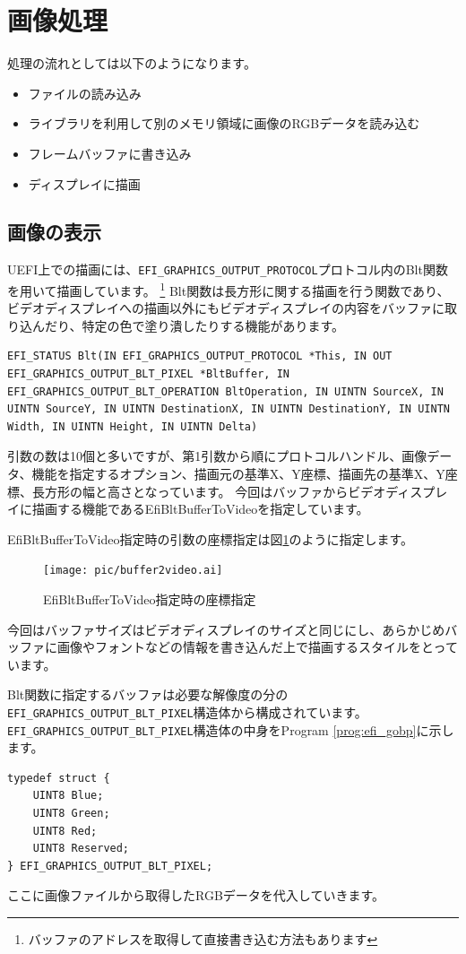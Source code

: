 \documentclass[10pt,b5paper,twoside,openany]{ltjsbook}
\begin{document}
\section{画像処理}
処理の流れとしては以下のようになります。
\begin{itemize}
    \item ファイルの読み込み
    \item ライブラリを利用して別のメモリ領域に画像のRGBデータを読み込む
    \item フレームバッファに書き込み
    \item ディスプレイに描画
\end{itemize}

\subsection{画像の表示}
UEFI上での描画には、\verb+EFI_GRAPHICS_OUTPUT_PROTOCOL+プロトコル内のBlt関数を用いて描画しています。
\footnote{バッファのアドレスを取得して直接書き込む方法もあります}
Blt関数は長方形に関する描画を行う関数であり、ビデオディスプレイへの描画以外にもビデオディスプレイの内容をバッファに取り込んだり、特定の色で塗り潰したりする機能があります。
\begin{lstlisting}[style=customC]
EFI_STATUS Blt(IN EFI_GRAPHICS_OUTPUT_PROTOCOL *This, IN OUT EFI_GRAPHICS_OUTPUT_BLT_PIXEL *BltBuffer, IN EFI_GRAPHICS_OUTPUT_BLT_OPERATION BltOperation, IN UINTN SourceX, IN UINTN SourceY, IN UINTN DestinationX, IN UINTN DestinationY, IN UINTN Width, IN UINTN Height, IN UINTN Delta)
\end{lstlisting}
引数の数は10個と多いですが、第1引数から順にプロトコルハンドル、画像データ、機能を指定するオプション、描画元の基準X、Y座標、描画先の基準X、Y座標、長方形の幅と高さとなっています。
今回はバッファからビデオディスプレイに描画する機能であるEfiBltBufferToVideoを指定しています。

EfiBltBufferToVideo指定時の引数の座標指定は図\ref{fig:buffer2video}のように指定します。
\begin{figure}[H]
    \centering
    \texttt{[image: pic/buffer2video.ai]}
    \caption{EfiBltBufferToVideo指定時の座標指定}
    \label{fig:buffer2video}
\end{figure}
今回はバッファサイズはビデオディスプレイのサイズと同じにし、あらかじめバッファに画像やフォントなどの情報を書き込んだ上で描画するスタイルをとっています。

Blt関数に指定するバッファは必要な解像度の分の\verb+EFI_GRAPHICS_OUTPUT_BLT_PIXEL+構造体から構成されています。
\verb+EFI_GRAPHICS_OUTPUT_BLT_PIXEL+構造体の中身をProgram \ref{prog:efi_gobp}に示します。
\begin{lstlisting}[style=customC,caption=EFI\_GRAPHICS\_OUTPUT\_BLT\_PIXEL,label=prog:efi_gobp]
typedef struct {
    UINT8 Blue;
    UINT8 Green;
    UINT8 Red;
    UINT8 Reserved;
} EFI_GRAPHICS_OUTPUT_BLT_PIXEL;
\end{lstlisting}
ここに画像ファイルから取得したRGBデータを代入していきます。
\end{document}
